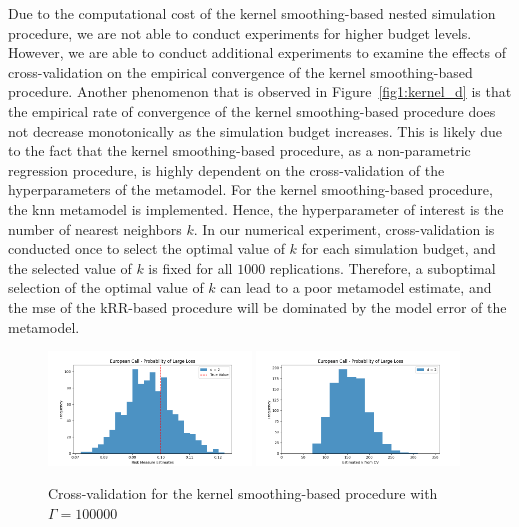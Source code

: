 Due to the computational cost of the kernel smoothing-based nested simulation procedure, we are not able to conduct experiments for higher budget levels.
However, we are able to conduct additional experiments to examine the effects of cross-validation on the empirical convergence of the kernel smoothing-based procedure.
Another phenomenon that is observed in Figure~\ref{fig1:kernel_d} is that the empirical rate of convergence of the kernel smoothing-based procedure does not decrease monotonically as the simulation budget increases.
This is likely due to the fact that the kernel smoothing-based procedure, as a non-parametric regression procedure, is highly dependent on the cross-validation of the hyperparameters of the metamodel.
For the kernel smoothing-based procedure, the \gls{knn} metamodel is implemented. 
Hence, the hyperparameter of interest is the number of nearest neighbors $k$.
In our numerical experiment, cross-validation is conducted once to select the optimal value of $k$ for each simulation budget, and the selected value of $k$ is fixed for all $\num{1000}$ replications.
Therefore, a suboptimal selection of the optimal value of $k$ can lead to a poor metamodel estimate, and the \gls{mse} of the kRR-based procedure will be dominated by the model error of the metamodel.

\begin{figure}[ht!]
    \centering
    \includegraphics[width=0.48\textwidth]{./project1/figures/figure5a.png}
    \includegraphics[width=0.48\textwidth]{./project1/figures/figure5b.png}
    \caption{Cross-validation for the kernel smoothing-based procedure with $\Gamma=\num{100000}$}
\label{fig1:kernel_cv} 
\end{figure}


